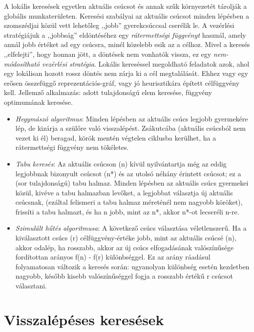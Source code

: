 \documentclass[margin=0px]{article}
\begin{document}
	A lokális keresések egyetlen aktuális csúcsot és annak szűk környezetét tárolják a globális munkaterületen. Keresési szabályai az aktuális csúcsot minden lépésben a szomszédjai közül vett lehetőleg  ,,jobb” gyerekcsúccsal cserélik le. A vezérlési stratégiájuk a ,,jobbság” eldöntéséhez egy \textit{rátermettségi függvényt} használ, amely annál jobb értéket ad egy csúcsra, minél közelebb esik az a célhoz. Mivel a keresés ,,elfelejti”, hogy honnan jött, a döntések nem vonhatók vissza, ez egy \textit{nem-módosítható vezérlési stratégia}.
	Lokális kereséssel megoldható feladatok azok, ahol egy lokálisan hozott rossz döntés nem zárja ki a cél megtalálását. Ehhez vagy egy erősen összefüggő reprezentációs-gráf, vagy jó heurisztikára épített
	célfüggvény kell. Jellemző alkalmazás: adott tulajdonságú elem keresése, függvény optimumának keresése.
	\begin{itemize}
		\item \textit{Hegymászó algoritmus}: Minden lépésben az aktuális csúcs legjobb gyermekére lép, de kizárja a szülőre való visszalépést. Zsákutcába (aktuális csúcsból nem vezet ki él) beragad, körök mentén végtelen ciklusba kerülhet, ha a rátermettségi függvény nem tökéletes.
		\item \textit{Tabu keresés}: Az aktuális csúcson (n) kívül nyilvántartja még az eddig legjobbnak bizonyult csúcsot (n*) és az utolsó néhány érintett csúcsot; ez a (sor tulajdonságú) tabu halmaz. Minden lépésben az aktuális csúcs gyermekei közül, kivéve a tabu halmazban levőket, a legjobbat választja új aktuális csúcsnak, (ezáltal felismeri a tabu halmaz méreténél nem nagyobb köröket), frissíti a tabu halmazt, és ha n jobb, mint az n*, akkor n*-ot lecseréli n-re.
		\item \textit{Szimulált hűtés algoritmusa}: A következő csúcs választása véletlenszerű. Ha a kiválasztott csúcs (r) célfüggvény-értéke jobb, mint az aktuális csúcsé (n), akkor odalép, ha rosszabb, akkor az új csúcs elfogadásának valószínűsége fordítottan arányos f(n) - f(r) különbséggel. Ez az arány ráadásul folyamatosan változik a keresés során: ugyanolyan különbség esetén kezdetben nagyobb, később kisebb valószínűséggel fogja a rosszabb értékű r csúcsot választani.
	\end{itemize}
	
	\section{Visszalépéses keresések}
	
\end{document}
